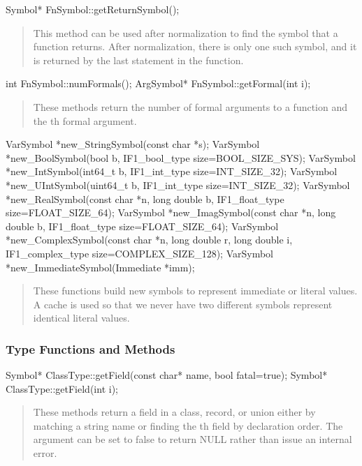 \documentclass[10pt]{article}
\begin{document}
\begin{clang}
Symbol* FnSymbol::getReturnSymbol();
\end{clang}
\begin{quote}
This method can be used after normalization to find the symbol that a
function returns.  After normalization, there is only one such symbol,
and it is returned by the last statement in the function.
\end{quote}

\begin{clang}
int FnSymbol::numFormals();
ArgSymbol* FnSymbol::getFormal(int i);
\end{clang}
\begin{quote}
These methods return the number of formal arguments to a function and
the th formal argument.
\end{quote}

\begin{clang}
VarSymbol *new_StringSymbol(const char *s);
VarSymbol *new_BoolSymbol(bool b, IF1_bool_type size=BOOL_SIZE_SYS);
VarSymbol *new_IntSymbol(int64_t b, IF1_int_type size=INT_SIZE_32);
VarSymbol *new_UIntSymbol(uint64_t b, IF1_int_type size=INT_SIZE_32);
VarSymbol *new_RealSymbol(const char *n, long double b, IF1_float_type size=FLOAT_SIZE_64);
VarSymbol *new_ImagSymbol(const char *n, long double b, IF1_float_type size=FLOAT_SIZE_64);
VarSymbol *new_ComplexSymbol(const char *n, long double r, long double i,
                             IF1_complex_type size=COMPLEX_SIZE_128);
VarSymbol *new_ImmediateSymbol(Immediate *imm);
\end{clang}
\begin{quote}
These functions build new symbols to represent immediate or literal
values.  A cache is used so that we never have two different symbols
represent identical literal values.
\end{quote}

\subsubsection{Type Functions and Methods}

\begin{clang}
Symbol* ClassType::getField(const char* name, bool fatal=true);
Symbol* ClassType::getField(int i);
\end{clang}
\begin{quote}
These methods return a field in a class, record, or union either by
matching a string name or finding the th field by declaration
order.  The argument  can be set to false to return NULL
rather than issue an internal error.
\end{quote}
\end{document}
